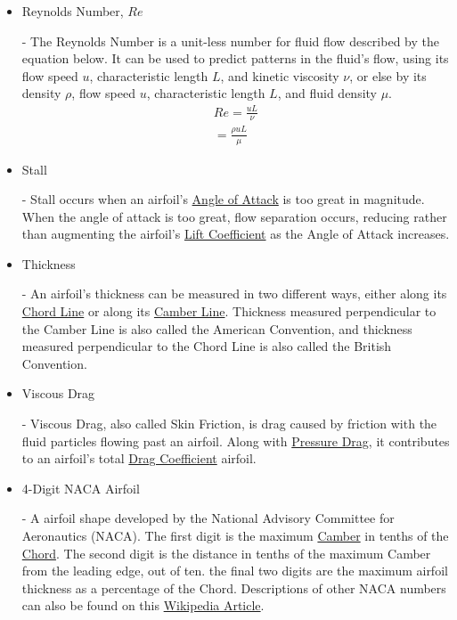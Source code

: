 \documentclass{article}
\begin{document}
\begin{itemize}
	\item \hypertarget{Re}{Reynolds Number, $Re$} - The Reynolds Number is a unit-less number for fluid flow described by the equation below. It can be used to predict patterns in the fluid's flow, using its flow speed $u$, characteristic length $L$, and kinetic viscosity $\nu$, or else by its density $\rho$, flow speed $u$, characteristic length $L$, and fluid density $\mu$.
		\begin{equation} \label{eq:17}
		\begin{aligned}
        			Re = \frac{uL}{\nu} \\
			= \frac{\rho uL}{\mu} 
	    	\end{aligned}
		\end{equation}
	
	\item \hypertarget{ST}{Stall} - Stall occurs when an airfoil's \hyperlink{alpha}{Angle of Attack} is too great in magnitude. When the angle of attack is too great, flow separation occurs, reducing rather than augmenting the airfoil's \hyperlink{CL}{Lift Coefficient} as the Angle of Attack increases.
	
	\item \hypertarget{Th}{Thickness} - An airfoil's thickness can be measured in two different ways, either along its \hyperlink{c}{Chord Line} or along its \hyperlink{Camber}{Camber Line}. Thickness measured perpendicular to the Camber Line is also called the American Convention, and thickness measured perpendicular to the Chord Line is also called the British Convention.
	
	\item \hypertarget{VD}{Viscous Drag} - Viscous Drag, also called Skin Friction, is drag caused by friction with the fluid particles flowing past an airfoil. Along with \hyperlink{PD}{Pressure Drag}, it contributes to an airfoil's total \hyperlink{CD}{Drag Coefficient} airfoil.
		
	\item \hypertarget{NACA}{4-Digit NACA Airfoil} - A airfoil shape developed by the National Advisory Committee for Aeronautics (NACA). The first digit is the maximum \hyperlink{Camber}{Camber} in tenths of the \hyperlink{c}{Chord}. The second digit is the distance in tenths of the maximum Camber from the leading edge, out of ten. the final two digits are the maximum airfoil thickness as a percentage of the Chord. Descriptions of other NACA numbers can also be found on this \href{https://en.wikipedia.org/wiki/NACA_airfoil}{Wikipedia Article}. 
	
\end{itemize}
\end{document}
